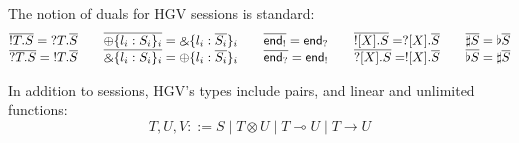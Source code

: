 \documentclass{easychair}
\makeatletter
\newcommand{\ba}{\begin{array}}
\newcommand{\ea}{\end{array}}
\newcommand{\bl}{\ba{@{}c@{}}}
\newcommand{\el}{\ea}
\newcommand{\key}{\mathsf}
\newcommand{\set}[1]{\{ #1 \}}
\newcommand{\row}[2]{\set{#1}_{#2}}
\newcommand{\gvOutput}[2]{\mathord{!}{#1}.{#2}}
\newcommand{\gvInput}[2]{\mathord{?}{#1}.{#2}}
\newcommand{\gvEndOutput}{\key{end}_!}
\newcommand{\gvEndInput}{\key{end}_?}
\newcommand{\gvPlus}[2]{\oplus \row{#1}{#2}}
\newcommand{\gvChoice}[2]{\binampersand \row{#1}{#2}}
\newcommand{\gvServer}[1]{\flat {#1}}
\newcommand{\gvService}[1]{\sharp {#1}}
\newcommand{\gvDual}[1]{\overline{#1}}
\newcommand{\gvOutputType}[2]{![{#1}].{#2}}
\newcommand{\gvInputType}[2]{?[{#1}].{#2}}
\newcommand{\la}{l}
\newcommand{\lolli}{\multimap}
\newcommand{\gvLinFun}[2]{{#1} \lolli {#2}}
\newcommand{\gvUnFun}[2]{{#1} \to {#2}}
\newcommand{\gvTimes}[2]{{#1} \otimes {#2}}
\newcommand{\gvUnitType}{\key{Unit}}
\newcommand{\un}[1]{\mathit{un}(#1)}
\newcommand{\lin}[1]{\mathit{lin}(#1)}
\newcommand{\hgv}{HGV\xspace}
\makeatother
\begin{document}
The notion of duals for \hgv sessions is standard:
\[
\bl
  \gvDual{\gvOutput{T}{S}} = \gvInput{T}{\gvDual{S}}
\qquad
  \gvDual{\gvPlus{\la_i:S_i}{i}} = \gvChoice{\la_i:\gvDual{S_i}}{i}
\qquad
  \gvDual{\gvEndOutput} = \gvEndInput
\qquad
  \gvDual{\gvOutputType{X}{S}} = \gvInputType{X}{\gvDual{S}}
\qquad
  \gvDual{\gvService{S}} = \gvServer{\gvDual{S}}
\\
  \gvDual{\gvInput{T}{S}} = \gvOutput{T}{\gvDual{S}}
\qquad
  \gvDual{\gvChoice{\la_i:S_i}{i}} = \gvPlus{\la_i:\gvDual{S_i}}{i}
\qquad
  \gvDual{\gvEndInput} = \gvEndOutput
\qquad
  \gvDual{\gvInputType{X}{S}} = \gvOutputType{X}{\gvDual{S}}
\qquad
  \gvDual{\gvServer{S}} = \gvService{\gvDual{S}}
\\
\el
\]

In addition to sessions, \hgv's types include pairs, and linear and unlimited functions:
\[
T,U,V ::= S \mid \gvTimes{T}{U} \mid \gvLinFun{T}{U} \mid \gvUnFun{T}{U}
\]





\end{document}
